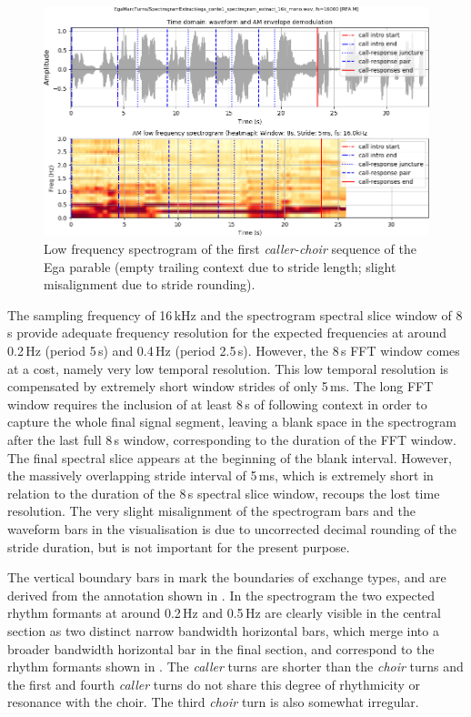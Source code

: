 \documentclass[output=paper,colorlinks,citecolor=brown]{langscibook}
\begin{document}
\begin{figure}
\includegraphics[width=\textwidth]{gibbon_figure07.png}
\caption{\label{fig:fig07}Low frequency spectrogram of the first \textit{caller-choir} sequence of the Ega parable (empty trailing context due to stride length; slight misalignment due to stride rounding).}
\end{figure}

The sampling frequency of 16\,kHz and the spectrogram spectral slice window of 8\,s provide adequate frequency resolution for the expected frequencies at around 0.2\,Hz (period 5\,s) and 0.4\,Hz (period 2.5\,s). However, the 8\,s FFT window comes at a cost, namely very low temporal resolution. This low temporal resolution is compensated by extremely short window strides of only 5\,ms. The long FFT window requires the inclusion of at least 8\,s of following context in order to capture the whole final signal segment, leaving a blank space in the spectrogram after the last full 8\,s window, corresponding to the duration of the FFT window. The final spectral slice appears at the beginning of the blank interval. However, the massively overlapping stride interval of 5\,ms, which is extremely short in relation to the duration of the 8\,s spectral slice window, recoups the lost time resolution. The very slight misalignment of the spectrogram bars and the waveform bars in the visualisation is due to uncorrected decimal rounding of the stride duration, but is not important for the present purpose.

The vertical boundary bars in  mark the boundaries of exchange types, and are derived from the annotation shown in . In the spectrogram the two expected rhythm formants at around 0.2\,Hz and 0.5\,Hz are clearly visible in the central section as two distinct narrow bandwidth horizontal bars, which merge into a broader bandwidth horizontal bar in the final section, and correspond to the rhythm formants shown in . The \textit{caller} turns are shorter than the \textit{choir} turns and the first and fourth \textit{caller} turns do not share this degree of rhythmicity or resonance with the choir. The third \textit{choir} turn is also somewhat irregular.
\end{document}
